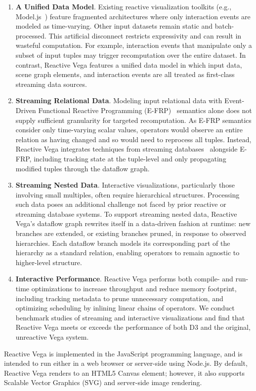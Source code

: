 \begin{enumerate}
  \item \textbf{A Unified Data Model}. Existing reactive visualization
toolkits (e.g., Model.js~\cite{kelleher:modeljs}) feature fragmented
architectures where only interaction events are modeled as time-varying. Other
input datasets remain static and batch-processed. This artificial disconnect
restricts expressivity and can result in wasteful computation. For example,
interaction events that manipulate only a subset of input tuples may trigger
recomputation over the entire dataset. In contrast, Reactive Vega features a
unified data model in which input data, scene graph elements, and interaction
events are all treated as first-class streaming data sources.

  \item \textbf{Streaming Relational Data}. Modeling input relational data with
Event-Driven Functional Reactive Programming (E-FRP)~\cite{wan:efrp} semantics
alone does not supply sufficient granularity for targeted recomputation. As
E-FRP semantics consider only time-varying scalar values, operators would
observe an entire relation as having changed and so would need to reprocess all
tuples. Instead, Reactive Vega integrates techniques from streaming
databases~\cite{abadi:borealis, abadi:aurora, arasu:stream, avnur:eddies,
chandrasekaran:telegraphcq} alongside E-FRP, including tracking state at the
tuple-level and only propagating modified tuples through the dataflow graph.

  \item \textbf{Streaming Nested Data}. Interactive visualizations, particularly
those involving small multiples, often require hierarchical structures.
Processing such data poses an additional challenge not faced by prior reactive
or streaming database systems. To support streaming nested data, Reactive Vega's
dataflow graph rewrites itself in a data-driven fashion at runtime: new branches
are extended, or existing branches pruned, in response to observed hierarchies.
Each dataflow branch models its corresponding part of the hierarchy as a
standard relation, enabling operators to remain agnostic to higher-level
structure.

  \item \textbf{Interactive Performance}. Reactive Vega performs both compile-
and run-time optimizations to increase throughput and reduce memory footprint,
including tracking metadata to prune unnecessary computation, and optimizing
scheduling by inlining linear chains of operators. We conduct benchmark
studies of streaming and interactive visualizations and find that Reactive
Vega meets or exceeds the performance of both D3 and the original, unreactive
Vega system.
\end{enumerate}

Reactive Vega is implemented in the JavaScript programming language, and is
intended to run either in a web browser or server-side using Node.js. By
default, Reactive Vega renders to an HTML5 Canvas element; however, it also
supports Scalable Vector Graphics (SVG) and server-side image rendering.




